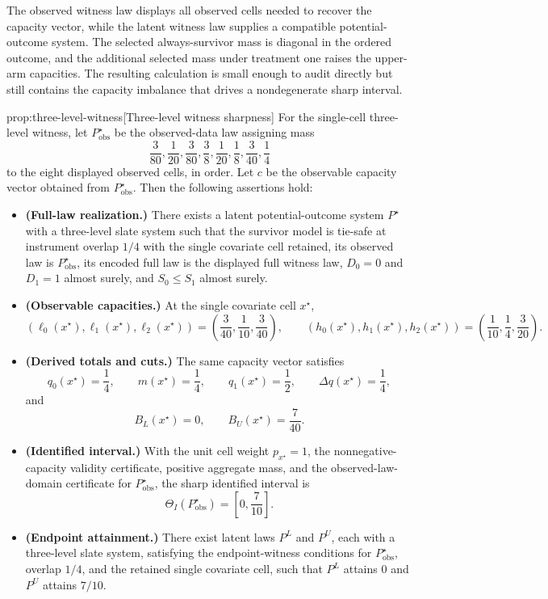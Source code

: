 \documentclass[11pt]{article}
\begin{document}
The observed witness law  displays all observed cells needed to recover the capacity vector, while the latent witness law  supplies a compatible potential-outcome system.  The selected always-survivor mass is diagonal in the ordered outcome, and the additional selected mass under treatment one raises the upper-arm capacities.  The resulting calculation is small enough to audit directly but still contains the capacity imbalance that drives a nondegenerate sharp interval.

\begin{theoremv}{prop:three-level-witness}[Three-level witness sharpness]
For the single-cell three-level witness, let \(P_{\mathrm{obs}}^{\star}\) be the observed-data law assigning mass
\[
\frac{3}{80},\frac{1}{20},\frac{3}{80},\frac{3}{8},\frac{1}{20},\frac{1}{8},\frac{3}{40},\frac{1}{4}
\]
to the eight displayed observed cells, in order.  Let \(c\) be the observable capacity vector obtained from \(P_{\mathrm{obs}}^{\star}\).  Then the following assertions hold:
\begin{itemize}
\item \textbf{(Full-law realization.)} There exists a latent potential-outcome system \(P^{\star}\) with a three-level slate system such that the survivor model is tie-safe at instrument overlap \(1/4\) with the single covariate cell retained, its observed law is \(P_{\mathrm{obs}}^{\star}\), its encoded full law is the displayed full witness law, \(D_0=0\) and \(D_1=1\) almost surely, and \(S_0\le S_1\) almost surely.
\item \textbf{(Observable capacities.)} At the single covariate cell \(x^{\star}\),
\[
(\ell_0(x^{\star}),\ell_1(x^{\star}),\ell_2(x^{\star}))
=
\left(\frac{3}{40},\frac{1}{10},\frac{3}{40}\right),
\qquad
(h_0(x^{\star}),h_1(x^{\star}),h_2(x^{\star}))
=
\left(\frac{1}{10},\frac{1}{4},\frac{3}{20}\right).
\]
\item \textbf{(Derived totals and cuts.)} The same capacity vector satisfies
\[
q_0(x^{\star})=\frac{1}{4},\qquad
m(x^{\star})=\frac{1}{4},\qquad
q_1(x^{\star})=\frac{1}{2},\qquad
\Delta q(x^{\star})=\frac{1}{4},
\]
and
\[
B_L(x^{\star})=0,
\qquad
B_U(x^{\star})=\frac{7}{40}.
\]
\item \textbf{(Identified interval.)} With the unit cell weight \(p_{x^{\star}}=1\), the nonnegative-capacity validity certificate, positive aggregate mass, and the observed-law-domain certificate for \(P_{\mathrm{obs}}^{\star}\), the sharp identified interval is
\[
\Theta_I(P_{\mathrm{obs}}^{\star})
=
\left[0,\frac{7}{10}\right].
\]
\item \textbf{(Endpoint attainment.)} There exist latent laws \(P^L\) and \(P^U\), each with a three-level slate system, satisfying the endpoint-witness conditions for \(P_{\mathrm{obs}}^{\star}\), overlap \(1/4\), and the retained single covariate cell, such that \(P^L\) attains \(0\) and \(P^U\) attains \(7/10\).
\end{itemize}
\end{theoremv}
\end{document}
